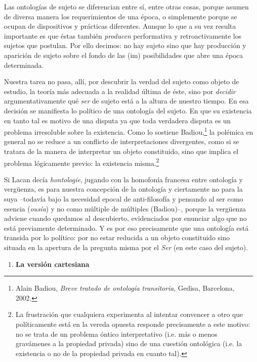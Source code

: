 \documentclass{book}
\begin{document}
Las ontologías de sujeto se diferencian entre sí, entre otras cosas,
porque asumen de diversa manera los requerimientos de una época, o
simplemente porque se ocupan de dispositivos y prácticas diferentes.
Aunque lo que a su vez resulta importante es que éstas también
\emph{producen} performativa y retroactivamente los sujetos que
postulan. Por ello decimos: no hay sujeto sino que hay producción y
aparición de sujeto sobre el fondo de las (im) posibilidades que abre
una época determinada.

Nuestra tarea no pasa, allí, por descubrir la verdad del sujeto como
objeto de estudio, la teoría más adecuada a la realidad última de éste,
sino por \emph{decidir} argumentativamente qué \emph{ser} de sujeto está
a la altura de nuestro tiempo. En esa decisión se manifiesta lo político
de una ontología del sujeto. En que su existencia en tanto tal es motivo
de una disputa ya que toda verdadera disputa es un problema irresoluble
sobre la existencia. Como lo sostiene Badiou,\footnote{Alain Badiou,
  \emph{Breve tratado de ontología transitoria}, Gedisa, Barcelona,
  2002.} la polémica en general no se reduce a un conflicto de
interpretaciones divergentes, como si se tratara de la manera de
interpretar un objeto constituido, sino que implica el problema
lógicamente previo: la existencia misma.\footnote{La frustración que
  cualquiera experimenta al intentar convencer a otro que políticamente
  está en la vereda opuesta responde precisamente a este motivo: no se
  trata de un problema óntico interpretativo (i.e. más o menos
  gravámenes a la propiedad privada) sino de una cuestión ontológica
  (i.e. la existencia o no de la propiedad privada en cuanto tal).}

Si Lacan decía \emph{hontologie}, jugando con la homofonía francesa
entre ontología y vergüenza, es para nuestra concepción de la ontología
y ciertamente no para la suya --todavía bajo la necesidad epocal de
anti-filosofía y pensando al ser como esencia (\emph{ousía}) y no como
múltiple de múltiples (Badiou)--, porque la vergüenza adviene cuando
quedamos al descubierto, evidenciados por enunciar algo que no está
previamente determinado. Y es por eso precisamente que una ontología
está transida por lo político: por no estar reducida a un objeto
constituido sino situada en la apertura de la pregunta misma por el
\emph{Ser} (en este caso del sujeto).

\begin{enumerate}
\def\labelenumi{\arabic{enumi}.}
\item
  \textbf{La versión cartesiana}
\end{enumerate}
\end{document}
